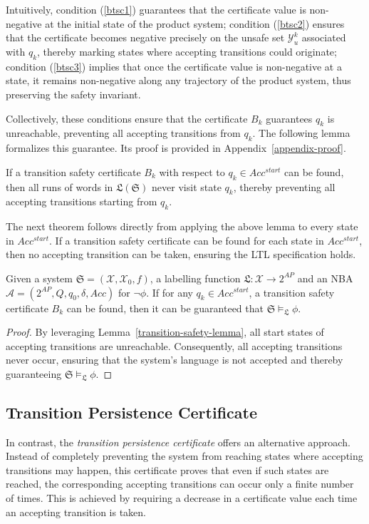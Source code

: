 Intuitively, condition (\ref{btsc1}) guarantees that the certificate value is non-negative at the initial state of the product system; condition (\ref{btsc2}) ensures that the certificate becomes negative precisely on the unsafe set $\mathcal{Y}_u^k$ associated with $q_k$, thereby marking states where accepting transitions could originate; condition (\ref{btsc3}) implies that once the certificate value is non-negative at a state, it remains non-negative along any trajectory of the product system, thus preserving the safety invariant.

Collectively, these conditions ensure that the certificate $B_k$ guarantees $q_k$ is unreachable, preventing all accepting transitions from $q_k$. The following lemma formalizes this guarantee. Its proof is provided in Appendix~\ref{appendix-proof}.

\begin{lemma}
  \label{transition-safety-lemma}
  If a transition safety certificate $B_k$ with respect to $q_k \in Acc^{start}$ can be found, then all runs of words in $\mathfrak{L}(\mathfrak{S})$ never visit state $q_k$, thereby preventing all accepting transitions starting from $q_k$.
\end{lemma}

The next theorem follows directly from applying the above lemma to every state in $Acc^{start}$. If a transition safety certificate can be found for each state in $Acc^{start}$, then no accepting transition can be taken, ensuring the LTL specification holds.

\begin{theorem}
  \label{transition-safety-LTL}
  Given a system $\mathfrak{S} = (\mathcal{X}, \mathcal{X}_0, f)$, a labelling function $\mathfrak{L}:\mathcal{X} \rightarrow 2^{AP}$ and an NBA $\mathcal{A} = (2^{AP}, Q, q_0, \delta, Acc)$ for $\neg\phi$. If for any $q_k \in Acc^{start}$, a transition safety certificate $B_k$ can be found, then it can be guaranteed that $\mathfrak{S} \models_{\mathfrak{L}} \phi$.
\end{theorem}

\begin{proof}
By leveraging Lemma~\ref{transition-safety-lemma}, all start states of accepting transitions are unreachable. Consequently, all accepting transitions never occur, ensuring that the system's language is not accepted and thereby guaranteeing $\mathfrak{S} \models_{\mathfrak{L}} \phi$.
\end{proof}

\subsection{Transition Persistence Certificate}
In contrast, the \emph{transition persistence certificate} offers an alternative approach. Instead of completely preventing the system from reaching states where accepting transitions may happen, this certificate proves that even if such states are reached, the corresponding accepting transitions can occur only a finite number of times. This is achieved by requiring a decrease in a certificate value each time an accepting transition is taken.

